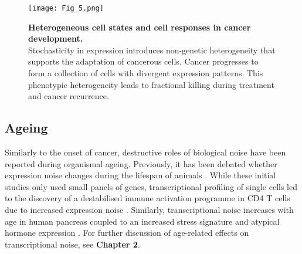 \begin{figure}[!h]
\centering
\texttt{[image: Fig\_5.png]}
\caption[Heterogeneous cell states and cell responses in cancer development]{\textbf{Heterogeneous cell states and cell responses in cancer development.}\\
Stochasticity in expression introduces non-genetic heterogeneity that supports the adaptation of cancerous cells. 
Cancer progresses to form a collection of cells with divergent expression patterns. 
This phenotypic heterogeneity leads to fractional killing during treatment and cancer recurrence.}
\label{fig0:cancer}
\end{figure}

\newpage

\subsection{Ageing}

Similarly to the onset of cancer, destructive roles of biological noise have been reported during organismal ageing. Previously, it has been debated whether expression noise changes during the lifespan of animals \cite{Bahar2006, Warren2007}. 
While these initial studies only used small panels of genes, transcriptional profiling of single cells led to the discovery of a destabilised immune activation programme in CD4\plus{} T cells due to increased expression noise \cite{Martinez-jimenez2017}. 
Similarly, transcriptional noise increases with age in human pancreas coupled to an increased stress signature and atypical hormone expression \citep{Enge2017}. 
For further discussion of age-related effects on transcriptional noise, see \textbf{Chapter 2}. \\


